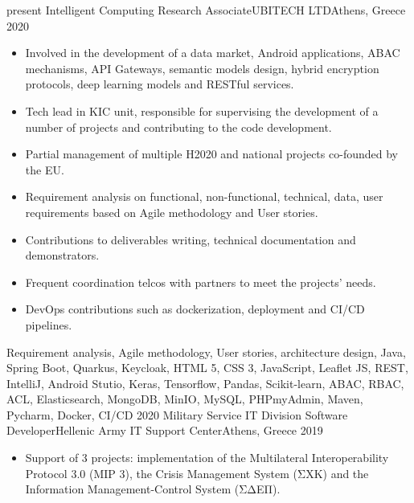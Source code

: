 \begin{experiences}
\experience
    {present}   {Intelligent Computing Research Associate}{UBITECH LTD}{Athens, Greece}
    {2020} {
                    \begin{itemize}
                    
                        \item Involved in the development of a data market, Android applications, ABAC mechanisms, API Gateways,
                                                        semantic models design, hybrid encryption protocols, deep learning models and RESTful services.
                                                        
                        \item Tech lead in KIC unit, responsible for supervising the development of a number of projects and contributing to the code development.
                        
                        \item Partial management of multiple H2020 and national projects co-founded by the EU.

                        \item Requirement analysis on functional, non-functional, technical, data, user requirements based on Agile methodology and User stories.

                        \item Contributions to deliverables writing, technical documentation and demonstrators.

                        \item Frequent coordination telcos with partners to meet the projects' needs.
                      
                        \item DevOps contributions such as dockerization, deployment and CI/CD pipelines.

                    \end{itemize}
                    }
                    {Requirement analysis, Agile methodology, User stories, architecture design, Java, Spring Boot, Quarkus, Keycloak, HTML 5, CSS 3, JavaScript, Leaflet JS, REST, IntelliJ, Android Stutio, Keras, Tensorflow, Pandas, Scikit-learn, ABAC, RBAC, ACL, Elasticsearch, MongoDB, MinIO, MySQL, PHPmyAdmin, Maven, Pycharm, Docker, CI/CD}
  \emptySeparator
  \experience
    {2020}   {Military Service IT Division Software Developer}{Hellenic Army IT Support Center}{Athens, Greece}
    {2019} {
                    \begin{itemize}
                      \item Support of 3 projects: implementation of the Multilateral Interoperability Protocol 3.0 (MIP 3), the Crisis Management System (ΣΧΚ) 
                      and the Information Management-Control System (ΣΔΕΠ).


\end{itemize}}
\end{experiences}
